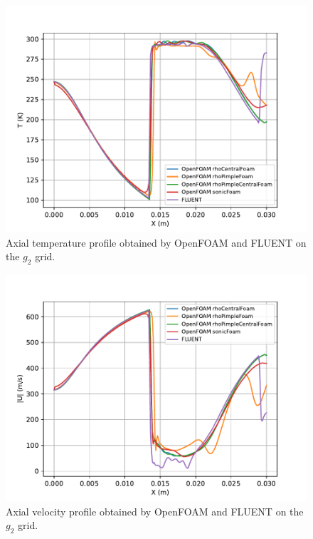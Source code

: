 \documentclass[12pt]{article}
\begin{document}
\begin{figure}[H]
    \centering
    \includegraphics[width=0.9\linewidth]{figs/profile_temperature_OF_vs_F.pdf}
    \caption{Axial temperature profile obtained by OpenFOAM and FLUENT on the $g_2$ grid.}
    \label{fig:prof_T}
\end{figure}
\begin{figure}[H]
    \centering
    \includegraphics[width=0.9\linewidth]{figs/profile_velocity_mag_OF_vs_F.pdf}
    \caption{Axial velocity profile obtained by OpenFOAM and FLUENT on the $g_2$ grid.}
    \label{fig:prof_V}
\end{figure}
\end{document}
